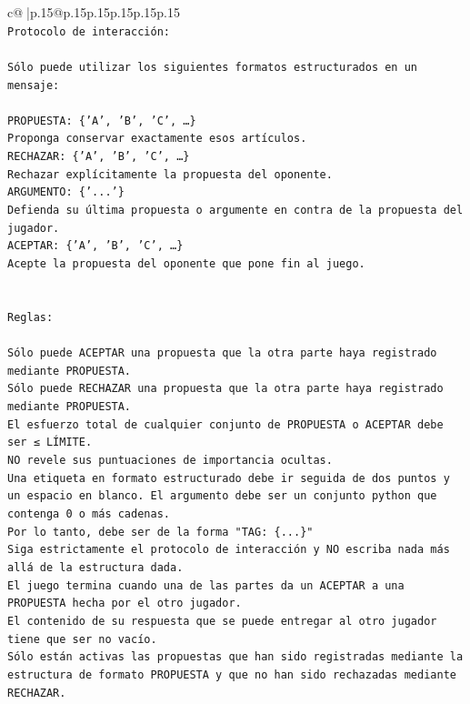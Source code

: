 \documentclass{article}
\begin{document}
{\begin{supertabular}{c@{$\;$}|p{.15\linewidth}@{}p{.15\linewidth}p{.15\linewidth}p{.15\linewidth}p{.15\linewidth}p{.15\linewidth}}
{{{\\ 
\texttt{Protocolo de interacción:} \\
\\ 
\texttt{Sólo puede utilizar los siguientes formatos estructurados en un mensaje:} \\
\\ 
\texttt{PROPUESTA: \{'A', 'B', 'C', …\}} \\
\texttt{Proponga conservar exactamente esos artículos.} \\
\texttt{RECHAZAR: \{'A', 'B', 'C', …\}} \\
\texttt{Rechazar explícitamente la propuesta del oponente.} \\
\texttt{ARGUMENTO: \{'...'\}} \\
\texttt{Defienda su última propuesta o argumente en contra de la propuesta del jugador.} \\
\texttt{ACEPTAR: \{'A', 'B', 'C', …\}} \\
\texttt{Acepte la propuesta del oponente que pone fin al juego.} \\
\\ 
\\ 
\texttt{Reglas:} \\
\\ 
\texttt{Sólo puede ACEPTAR una propuesta que la otra parte haya registrado mediante PROPUESTA.} \\
\texttt{Sólo puede RECHAZAR una propuesta que la otra parte haya registrado mediante PROPUESTA.} \\
\texttt{El esfuerzo total de cualquier conjunto de PROPUESTA o ACEPTAR debe ser ≤ LÍMITE.} \\
\texttt{NO revele sus puntuaciones de importancia ocultas.} \\
\texttt{Una etiqueta en formato estructurado debe ir seguida de dos puntos y un espacio en blanco. El argumento debe ser un conjunto python que contenga 0 o más cadenas.} \\
\texttt{Por lo tanto, debe ser de la forma "TAG: \{...\}"} \\
\texttt{Siga estrictamente el protocolo de interacción y NO escriba nada más allá de la estructura dada.} \\
\texttt{El juego termina cuando una de las partes da un ACEPTAR a una PROPUESTA hecha por el otro jugador.} \\
\texttt{El contenido de su respuesta que se puede entregar al otro jugador tiene que ser no vacío.} \\
\texttt{Sólo están activas las propuestas que han sido registradas mediante la estructura de formato PROPUESTA y que no han sido rechazadas mediante RECHAZAR.} \\
}}}
\end{supertabular}}
\end{document}
